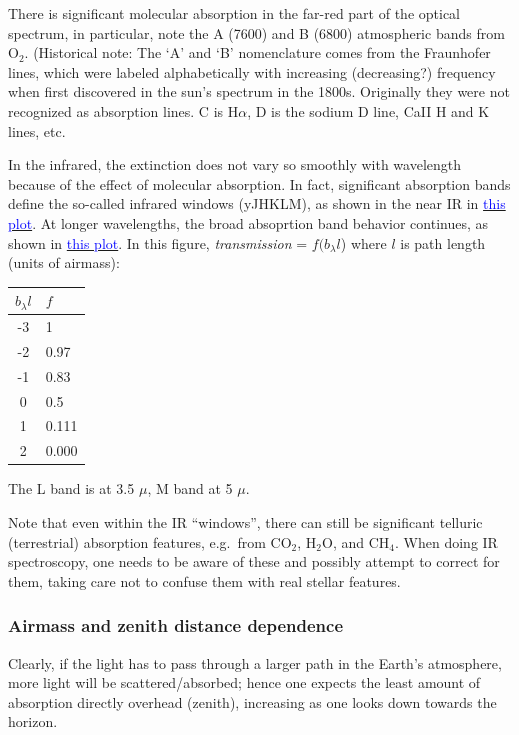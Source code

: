 \documentclass[12pt]{article}
\begin{document}
There is significant molecular absorption in the far-red part of the
optical spectrum, in particular, note the A (7600) and B (6800)
atmospheric bands from O$_2$.
(Historical note: The `A' and `B' nomenclature comes from the
Fraunhofer lines, which were labeled alphabetically with increasing
(decreasing?) frequency when first
discovered in the sun's spectrum in the 1800s. Originally they were
not recognized as absorption lines. C is H$\alpha$, D is the sodium D
line, CaII H and K lines, etc.

In the infrared, the extinction does not vary so smoothly with
wavelength because of the effect of molecular absorption. In fact,
significant absorption bands define the so-called infrared windows
(yJHKLM), as shown in the near IR in
\href{http://astronomy.nmsu.edu/holtz/a535/html/diagrams/a535/mandbell.htm}
{\textcolor{blue}{this plot}}.
At longer wavelengths,
the broad absoprtion band behavior continues, as shown in
\href{http://astronomy.nmsu.edu/holtz/a535/html/diagrams/a535/allen1.htm}
{\textcolor{blue}{this plot}}.
In this figure, \emph{transmission} = $f(b_{\lambda}l$) where $l$
is path length (units of airmass):

\begin{table}[h]
\centering
\begin{tabular}{c l}
$b_{\lambda}l$ & $f$\\
\hline\hline
-3  & 1\\
-2  & 0.97\\
-1  & 0.83\\
0   & 0.5\\
1   & 0.111\\
2   & 0.000\\
\hline
\end{tabular}
\end{table}

The L band is at 3.5 $\mu$, M band at 5 $\mu$.

Note that even within the IR ``windows'', there can still be
significant telluric (terrestrial) absorption features,
e.g.\ from CO$_2$, H$_2$O, and CH$_4$.
When doing IR spectroscopy, one needs to be aware of these and
possibly attempt to correct for them, taking care not to confuse them
with real stellar features.

\subsubsection*{Airmass and zenith distance dependence}

Clearly, if the light has to pass through a larger path in the Earth's
atmosphere, more light will be scattered/absorbed; hence one expects
the least amount of absorption directly overhead (zenith), increasing
as one looks down towards the horizon.
\end{document}
